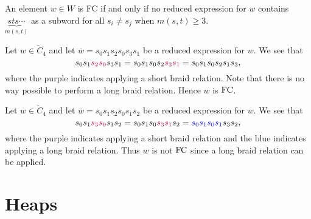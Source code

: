 \begin{theorem}
	An element $w \in W$ is FC if and only if no reduced expression for $w$ contains $\underbrace{sts\cdots}_{m(s,t)}$ as a subword for all $s_i \neq s_j$ when $m(s,t) \geq 3$.
\end{theorem}

\begin{example}
	Let $w \in \widetilde{C}_4$ and let $\overline{w}=s_0s_1s_2s_0s_3s_1$ be a reduced expression for $w$. We see that
	\[s_0s_1\textcolor{purple}{s_2s_0}s_3s_1=s_0s_1s_0s_2\textcolor{purple}{s_3s_1}=s_0s_1s_0s_2s_1s_3,\]
	where the purple indicates applying a short braid relation. Note that there is no way possible to perform a long braid relation. Hence $w$ is $\mathrm{FC}$.
\end{example}

\begin{example}
Let $w \in \widetilde{C}_4$ and let $\overline{w}=s_0s_1s_2s_0s_1s_2$ be a reduced expression for $w$. We see that
\[s_0s_1\textcolor{purple}{s_3s_0}s_1s_2=s_0s_1s_0\textcolor{purple}{s_3s_1}s_2=\textcolor{blue}{s_0s_1s_0s_1}s_3s_2,\]
where the purple indicates applying a short braid relation and the blue indicates applying a long braid relation. Thus $w$ is not $\mathrm{FC}$ since a long braid relation can be applied.  	
\end{example}





\section{Heaps}\label{sec:Heaps}

